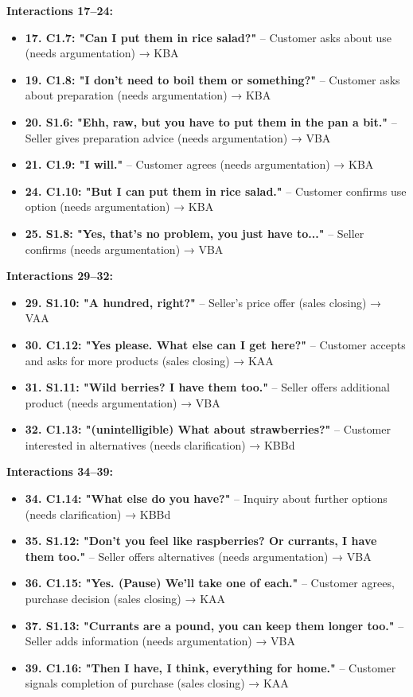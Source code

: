 \documentclass[
]{article}
\begin{document}
\textbf{Interactions 17--24:}

\begin{itemize}
\item
  \textbf{17. C1.7: "Can I put them in rice salad?"} -- Customer asks about use (needs argumentation) → KBA
\item
  \textbf{19. C1.8: "I don't need to boil them or something?"} -- Customer asks about preparation (needs argumentation) → KBA
\item
  \textbf{20. S1.6: "Ehh, raw, but you have to put them in the pan a bit."} -- Seller gives preparation advice (needs argumentation) → VBA
\item
  \textbf{21. C1.9: "I will."} -- Customer agrees (needs argumentation) → KBA
\item
  \textbf{24. C1.10: "But I can put them in rice salad."} -- Customer confirms use option (needs argumentation) → KBA
\item
  \textbf{25. S1.8: "Yes, that's no problem, you just have to..."} -- Seller confirms (needs argumentation) → VBA
\end{itemize}

\textbf{Interactions 29--32:}

\begin{itemize}
\item
  \textbf{29. S1.10: "A hundred, right?"} -- Seller's price offer (sales closing) → VAA
\item
  \textbf{30. C1.12: "Yes please. What else can I get here?"} -- Customer accepts and asks for more products (sales closing) → KAA
\item
  \textbf{31. S1.11: "Wild berries? I have them too."} -- Seller offers additional product (needs argumentation) → VBA
\item
  \textbf{32. C1.13: "(unintelligible) What about strawberries?"} -- Customer interested in alternatives (needs clarification) → KBBd
\end{itemize}

\textbf{Interactions 34--39:}

\begin{itemize}
\item
  \textbf{34. C1.14: "What else do you have?"} -- Inquiry about further options (needs clarification) → KBBd
\item
  \textbf{35. S1.12: "Don't you feel like raspberries? Or currants, I have them too."} -- Seller offers alternatives (needs argumentation) → VBA
\item
  \textbf{36. C1.15: "Yes. (Pause) We'll take one of each."} -- Customer agrees, purchase decision (sales closing) → KAA
\item
  \textbf{37. S1.13: "Currants are a pound, you can keep them longer too."} -- Seller adds information (needs argumentation) → VBA
\item
  \textbf{39. C1.16: "Then I have, I think, everything for home."} -- Customer signals completion of purchase (sales closing) → KAA
\end{itemize}
\end{document}
